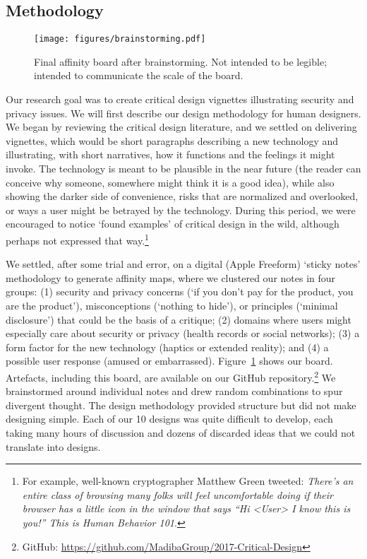 \subsection{Methodology}

\begin{figure}[t]
\begin{center}
\texttt{[image: figures/brainstorming.pdf]}
\caption{Final affinity board after brainstorming. Not intended to be legible; intended to communicate the scale of the board.\label{fig:board}}
\end{center}
\end{figure}


Our research goal was to create critical design vignettes illustrating security and privacy issues. We will first describe our design methodology for human designers. We began by reviewing the critical design literature, and we settled on delivering vignettes, which would be short paragraphs describing a new technology and illustrating, with short narratives, how it functions and the feelings it might invoke. The technology is meant to be plausible in the near future (the reader can conceive why someone, somewhere might think it is a good idea), while also showing the darker side of convenience, risks that are normalized and overlooked, or ways a user might be betrayed by the technology. During this period, we were encouraged to notice `found examples' of critical design in the wild, although perhaps not expressed that way.\footnote{For example, well-known cryptographer Matthew Green tweeted: \textit{There’s an entire class of browsing many folks will feel uncomfortable doing if their browser has a little icon in the window that says “Hi <User> I know this is you!” This is Human Behavior 101}.}

We settled, after some trial and error, on a digital (Apple Freeform) `sticky notes' methodology to generate affinity maps, where we clustered our notes in four groups: (1) security and privacy concerns (\eg `if you don't pay for the product, you are the product'), misconceptions (\eg `nothing to hide'), or principles (\eg `minimal disclosure')  that could be the basis of a critique; (2) domains where users might especially care about security or privacy (\eg health records or social networks); (3) a form factor for the new technology (\eg haptics or extended reality); and (4) a possible user response (\eg amused or embarrassed). Figure~\ref{fig:board} shows our board. Artefacts, including this board, are available on our GitHub repository.\footnote{GitHub: \url{https://github.com/MadibaGroup/2017-Critical-Design}} We brainstormed around individual notes and drew random combinations to spur divergent thought. The design methodology provided structure but did not make designing simple. Each of our 10 designs was quite difficult to develop, each taking many hours of discussion and dozens of discarded ideas that we could not translate into designs. 

